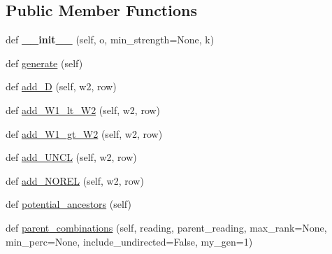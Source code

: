 \subsection*{Public Member Functions}
\begin{DoxyCompactItemize}
\item 
\mbox{\label{classCBGM_1_1lib_1_1genealogical__coherence_1_1GenealogicalCoherence_a97d498f36897e5bcfd3f1d8821358642}} 
def {\bfseries \+\_\+\+\_\+init\+\_\+\+\_\+} (self, o, min\+\_\+strength=None, k)
\item 
def \hyperlink{classCBGM_1_1lib_1_1genealogical__coherence_1_1GenealogicalCoherence_a85db3f16efe9e55e34d2d6f22d9abfe9}{generate} (self)
\item 
def \hyperlink{classCBGM_1_1lib_1_1genealogical__coherence_1_1GenealogicalCoherence_af457b8df3b3ff1dbd846114e352f6715}{add\+\_\+D} (self, w2, row)
\item 
def \hyperlink{classCBGM_1_1lib_1_1genealogical__coherence_1_1GenealogicalCoherence_adb225962d134e23024f5072994ea9d73}{add\+\_\+\+W1\+\_\+lt\+\_\+\+W2} (self, w2, row)
\item 
def \hyperlink{classCBGM_1_1lib_1_1genealogical__coherence_1_1GenealogicalCoherence_a21319e40e3e74f13c007f49d71468d07}{add\+\_\+\+W1\+\_\+gt\+\_\+\+W2} (self, w2, row)
\item 
def \hyperlink{classCBGM_1_1lib_1_1genealogical__coherence_1_1GenealogicalCoherence_ab190887d1943928f03642eba77928bc4}{add\+\_\+\+U\+N\+CL} (self, w2, row)
\item 
def \hyperlink{classCBGM_1_1lib_1_1genealogical__coherence_1_1GenealogicalCoherence_a78b9d863a9d1db1cdb483bc62172198d}{add\+\_\+\+N\+O\+R\+EL} (self, w2, row)
\item 
def \hyperlink{classCBGM_1_1lib_1_1genealogical__coherence_1_1GenealogicalCoherence_af1572e7d21def128aaacac243d3ec348}{potential\+\_\+ancestors} (self)
\item 
def \hyperlink{classCBGM_1_1lib_1_1genealogical__coherence_1_1GenealogicalCoherence_aad49647f1473cb8aca60c1792a046b7b}{parent\+\_\+combinations} (self, reading, parent\+\_\+reading, max\+\_\+rank=None, min\+\_\+perc=None, include\+\_\+undirected=False, my\+\_\+gen=1)
\end{DoxyCompactItemize}
